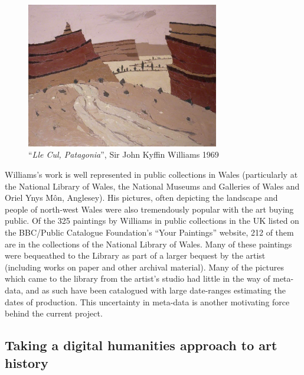 \begin{figure}[h]
\centering
\includegraphics[width=0.75\textwidth]{img/lle-cul.jpg}
\caption[``\emph{Lle Cul, Patagonia}'']{``\emph{Lle Cul, Patagonia}'', Sir John Kyffin Williams 1969}
\label{fig:lle-cul}
\end{figure}

Williams's work is well represented in public collections in Wales
(particularly at the National Library of Wales, the National Museums and
Galleries of Wales and Oriel Ynys M\^{o}n, Anglesey). His pictures, often
depicting the landscape and people of north-west Wales were also tremendously
popular with the art buying public. Of the 325 paintings by Williams in public
collections in the UK listed on the BBC/Public Catalogue Foundation's ``Your
Paintings'' website, 212 of them are in the collections of the National Library
of Wales\cite{2013Your}. Many of these paintings were bequeathed to the Library
as part of a larger bequest by the artist (including works on paper and other
archival material). Many of the pictures which came to the library from the
artist's studio had little in the way of meta-data, and as such have been
catalogued with large date-ranges estimating the dates of production.  This
uncertainty in meta-data is another motivating force behind the current project.


\subsection{Taking a digital humanities approach to art history}

